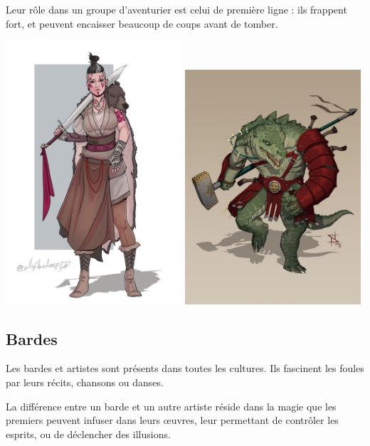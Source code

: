 \documentclass[10pt,a4paper]{book}
\begin{document}
Leur rôle dans un groupe d'aventurier est celui de première ligne : ils frappent fort, et peuvent encaisser beaucoup de coups avant de tomber.

\includegraphics[width=0.49\textwidth]{barbare 1}
\includegraphics[width=0.49\textwidth]{barbare 2}
\subsection{Bardes}
Les bardes et artistes sont présents dans toutes les cultures. Ils fascinent les foules par leurs récits, chansons ou danses. 

La différence entre un barde et un autre artiste réside dans la magie que les premiers peuvent infuser dans leurs œuvres, leur permettant de contrôler les esprits, ou de déclencher des illusions.
\end{document}
